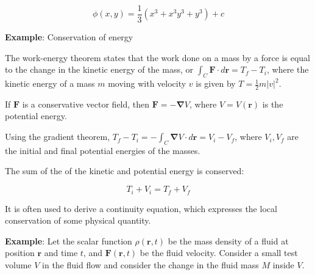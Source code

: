 \begin{paracol}{2}
$$
\phi(x, y) = \frac{1}{3} (x^3 + x^3 y^3 + y^3) + c
$$

\textbf{Example}: Conservation of energy

The work-energy theorem states that the work done on a mass by a force is equal to the change in the kinetic energy of the mass, or $\int_C \mathbf{F} \cdot d\mathbf{r} = T_f - T_i$, where the kinetic energy of a mass $m$ moving with velocity $v$ is given by $T = \frac{1}{2} m |v|^2$.

If $\mathbf{F}$ is a conservative vector field, then $\mathbf{F} = - \mathbf{\nabla} V$, where $V = V(\mathbf{r})$ is the potential energy.

Using the gradient theorem, $T_f - T_i = - \int_C \mathbf{\nabla} V \cdot d\mathbf{r} = V_i - V_f$, where $V_i, V_f$ are the initial and final potential energies of the masses.

The sum of the of the kinetic and potential energy is conserved:

$$T_i + V_i = T_f + V_f$$

\switchcolumn


It is often used to derive a continuity equation, which expresses the local conservation of some physical quantity.

\textbf{Example}: Let the scalar function $\rho(\mathbf{r}, t)$ be the mass density of a fluid at position $\mathbf{r}$ and time $t$, and $\mathbf{F}(\mathbf{r}, t)$ be the fluid velocity. Consider a small test volume $V$ in the fluid flow and consider the change in the fluid mass $M$ inside $V$.


\end{paracol}
